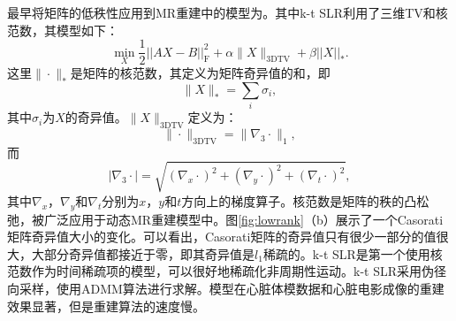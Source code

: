 最早将矩阵的低秩性应用到MR重建中的模型为\cite{zhao2012image,Sajan2011Accelerated}。其中k-t SLR\cite{Sajan2011Accelerated}利用了三维TV和核范数，其模型如下：
\begin{equation}
	\min_X \frac{1}{2}||AX-B||^2_\mathrm{F}+\alpha\|X\|_{\mathrm{3DTV}}+\beta||X||_*.
\end{equation}
这里$\|\cdot\|_*$是矩阵的核范数，其定义为矩阵奇异值的和，即
$$\|X\|_*=\sum_i\sigma_i,$$
其中$\sigma_i$为$X$的奇异值。$\|X\|_{\mathrm{3DTV}}$定义为：
$$\|\cdot\|_\mathrm{3DTV}=\|\nabla_3\cdot\|_1,$$
而
$$|\nabla_3\cdot|=\sqrt{(\nabla_x \cdot)^2 + (\nabla_y \cdot)^2+(\nabla_t \cdot)^2},$$
其中$\nabla_x$，$\nabla_y$和$\nabla_t$分别为$x$，$y$和$t$方向上的梯度算子。核范数是矩阵的秩的凸松弛，被广泛应用于动态MR重建模型中。图\ref{fig:lowrank}（b）展示了一个Casorati矩阵奇异值大小的变化。可以看出，Casorati矩阵的奇异值只有很少一部分的值很大，大部分奇异值都接近于零，即其奇异值是$l_1$稀疏的。k-t SLR是第一个使用核范数作为时间稀疏项的模型，可以很好地稀疏化非周期性运动。k-t SLR采用伪径向采样，使用ADMM算法进行求解。模型在心脏体模数据和心脏电影成像的重建效果显著，但是重建算法的速度慢。

